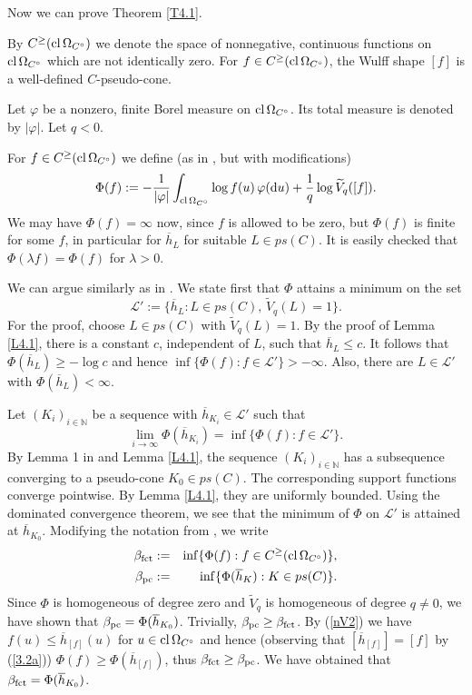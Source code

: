 \documentclass[12pt]{article}
\newcommand{\0}{\mbox{\boldmath$o$}}
\newcommand{\N}{{\mathbb N}}
\newcommand{\D}{{\rm d}}
\begin{document}
Now we can prove Theorem \ref{T4.1}.

By $C^{\ge}({\rm cl}\,\Omega_{C^\circ})$ we denote the space of nonnegative, continuous functions on ${\rm cl}\,\Omega_{C^\circ}$ which are not identically zero. For $f\in C^{\ge}({\rm cl}\,\Omega_{C^\circ})$, the Wulff shape $[f]$ is a well-defined $C$-pseudo-cone.

Let $\varphi$ be a nonzero, finite Borel measure on ${\rm cl}\,\Omega_{C^\circ}$. Its total measure is denoted by $|\varphi|$. Let $q<0$.

For $f\in C^{\ge}({\rm cl}\,\Omega_{C^\circ})$ we define (as in \cite{LYZ24}, but with modifications)
$$ \Phi(f) := -\frac{1}{|\varphi|} \int_{{\rm cl}\,\Omega_{C^\circ}} \log f(u)\,\varphi(\D u) +\frac{1}{q}\log \widetilde V_q([f]).$$
We may have $\Phi(f)=\infty$ now, since $f$ is allowed to be zero, but $\Phi(f)$ is finite for some $f$, in particular for $\overline h_L$ for suitable $L\in ps(C)$. It is easily checked that $\Phi(\lambda f)= \Phi(f)$ for $\lambda>0$.

We can argue similarly as in \cite[Sect. 9]{Sch18}. We state  first that $\Phi$ attains a minimum on the set 
$${\mathcal L}':= \{\overline h_L: L\in ps(C),\,\widetilde V_q(L)=1\}.$$ 
For the proof, choose $L\in ps(C)$ with $\widetilde V_q(L)=1$. By the proof of Lemma \ref{L4.1}, there is a constant $c$, independent of $L$, such that $\overline h_L\le c$. It follows that $\Phi(\overline h_L)\ge -\log c$ and hence $\inf \{\Phi(f):f\in{\mathcal L}'\}>-\infty$. Also, there are $L\in{\mathcal L}'$ with $\Phi(\overline h_L)<\infty$.

Let $(K_i)_{i\in\N}$ be a sequence with $\overline h_{K_i}\in{\mathcal L}'$ such that
$$ \lim_{i\to\infty} \Phi(\overline h_{K_i}) = \inf\{\Phi(f):f\in{\mathcal L}'\}.$$
By Lemma 1 in \cite{Sch24a} and Lemma \ref{L4.1}, the sequence $(K_i)_{i\in\N}$ has a subsequence converging to a pseudo-cone $K_0\in ps(C)$. The corresponding support functions converge pointwise. By Lemma \ref{L4.1}, they are uniformly bounded. Using the dominated convergence theorem, we see that the minimum of $\Phi$ on ${\mathcal L}'$ is attained at $\overline h_{K_0}$. Modifying the notation from \cite[Sect. 6]{LYZ24}, we write
\begin{eqnarray*}
\beta_{\rm fct} &:=& \inf\{\Phi(f): f\in C^{\ge}({\rm cl}\,\Omega_{C^\circ})\},\\
\beta_{\rm pc} &:=& \inf\{\Phi(\overline h_K): K\in ps(C)\}.
\end{eqnarray*}
Since $\Phi$ is homogeneous of degree zero and $\widetilde V_q$ is homogeneous of degree $q\not= 0$, we have shown that $\beta_{\rm pc}=\Phi(\overline h_{K_0})$. Trivially, $\beta_{\rm pc} \ge \beta_{\rm fct}$. By (\ref{nV2}) we have $f(u)\le \overline h_{[f]}(u)$ for $u\in{\rm cl}\,\Omega_{C^\circ}$ and hence (observing that $[\overline h_{[f]}]=[f]$ by (\ref{3.2a})) $\Phi(f)\ge \Phi(\overline h_{[f]})$, thus $\beta_{\rm fct}\ge \beta_{\rm pc}$. We have obtained that $\beta_{\rm fct}= \Phi(\overline h_{K_0})$.
\end{document}
